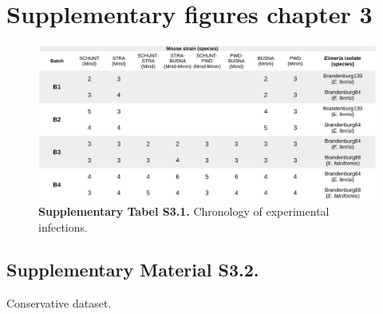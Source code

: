 \newpage

\section*{Supplementary figures chapter 3}

\begin{figure}[H]
	\centering
	\includegraphics[width=\linewidth,height=\textheight,keepaspectratio]{images/3article2/SupplementaryTableS1.pdf}
	\captionsetup{labelformat=empty}
	\caption{\textbf{Supplementary Tabel S3.1.} Chronology of experimental infections.}
\end{figure}

\subsection*{Supplementary Material S3.2.} Conservative dataset.

